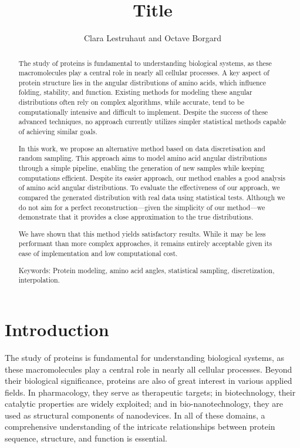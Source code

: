 \documentclass{article}
\title{Title}
\author{Clara Lestruhaut and Octave Borgard}
\date{}
\begin{document}
  

\maketitle  

\begin{abstract}

The study of proteins is fundamental to understanding biological systems, as these macromolecules play a central role in nearly all cellular processes. A key aspect of protein structure lies in the angular distributions of amino acids, which influence folding, stability, and function. Existing methods for modeling these angular distributions often rely on complex algorithms, while accurate, tend to be computationally intensive and difficult to implement. Despite the success of these advanced techniques, no approach currently utilizes simpler statistical methods capable of achieving similar goals.  

In this work, we propose an alternative method based on data discretisation and random sampling. This approach aims to model amino acid angular distributions through a simple pipeline, enabling the generation of new samples while keeping computations efficient. Despite its easier approach, our method enables a good analysis of amino acid angular distributions. To evaluate the effectiveness of our approach, we compared the generated distribution with real data using statistical tests.  Although we do not aim for a perfect reconstruction—given the simplicity of our method—we demonstrate that it provides a close approximation to the true distributions.

We have shown that this method yields satisfactory results. While it may be less performant than more complex approaches, it remains entirely acceptable given its ease of implementation and low computational cost.

\newline
Keywords: Protein modeling, amino acid angles, statistical sampling, discretization, interpolation.  
   
    
\end{abstract}
\newpage
\tableofcontents
\newpage



\section{Introduction}

The study of proteins is fundamental for understanding biological systems, as these macromolecules play a central role in nearly all cellular processes. Beyond their biological significance, proteins are also of great interest in various applied fields. In pharmacology, they serve as therapeutic targets; in biotechnology, their catalytic properties are widely exploited; and in bio-nanotechnology, they are used as structural components of nanodevices. In all of these domains, a comprehensive understanding of the intricate relationships between protein sequence, structure, and function is essential.\\ 
\end{document}
